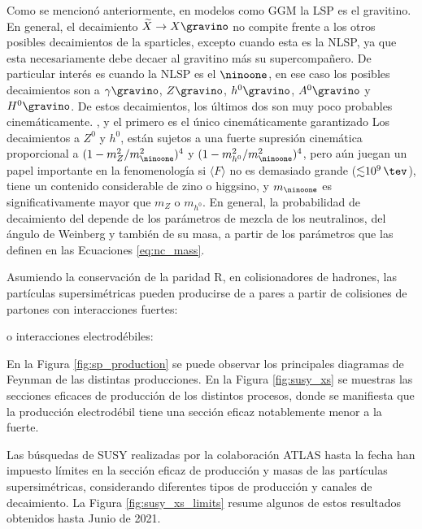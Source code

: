 Como se mencionó anteriormente, en modelos como GGM la LSP es el gravitino. En general, el decaimiento $\widetilde{X} \to X\gravino$ no compite frente a los otros posibles decaimientos de la sparticles, excepto cuando esta es la NLSP, ya que esta necesariamente debe decaer al gravitino más su supercompañero. De particular interés es cuando la NLSP es el $\ninoone$, en ese caso los posibles decaimientos son a $\gamma\gravino$, $Z\gravino$, $h^0\gravino$, $A^0\gravino$ y $H^0\gravino$. De estos decaimientos, los últimos dos son muy poco probables cinemáticamente.
, y el primero es el único cinemáticamente garantizado 
Los decaimientos a $Z^0$ y $h^0$, están sujetos a una fuerte supresión cinemática proporcional a $ (1-m_{Z}^{2}/m_{\ninoone}^{2})^4$ y $(1-m_{h^{0}}^{2}/m_{\ninoone}^{2})^4$, pero aún juegan un papel importante en la fenomenología si $ \langle F \rangle $ no es demasiado grande (${\lesssim}10^9\,\tev$), \ninoone tiene un contenido considerable de zino o higgsino, y $m_{\ninoone}$ es significativamente mayor que $m_{Z}$ o $m_{h^{0}}$. 
En general, la probabilidad de decaimiento del \ninoone depende de los parámetros de mezcla de los neutralinos, del ángulo de Weinberg y también de su masa, a partir de los parámetros que las definen en las Ecuaciones \ref{eq:nc_mass}.



Asumiendo la conservación de la paridad R, en colisionadores de hadrones, las partículas supersimétricas pueden producirse de a pares a partir de colisiones de partones con interacciones fuertes:




o interacciones electrodébiles:


En la Figura \ref{fig:sp_production} se puede observar los principales diagramas de Feynman de las distintas producciones. En la Figura \ref{fig:susy_xs} se muestras las secciones eficaces de producción de los distintos procesos, donde se manifiesta que la producción electrodébil tiene una sección eficaz notablemente menor a la fuerte.



Las búsquedas de SUSY realizadas por la colaboración ATLAS hasta la fecha han impuesto límites en la sección eficaz de producción y masas de las partículas supersimétricas, considerando diferentes tipos de producción y canales de decaimiento. La Figura \ref{fig:susy_xs_limits} resume algunos de estos resultados obtenidos hasta Junio de 2021.







